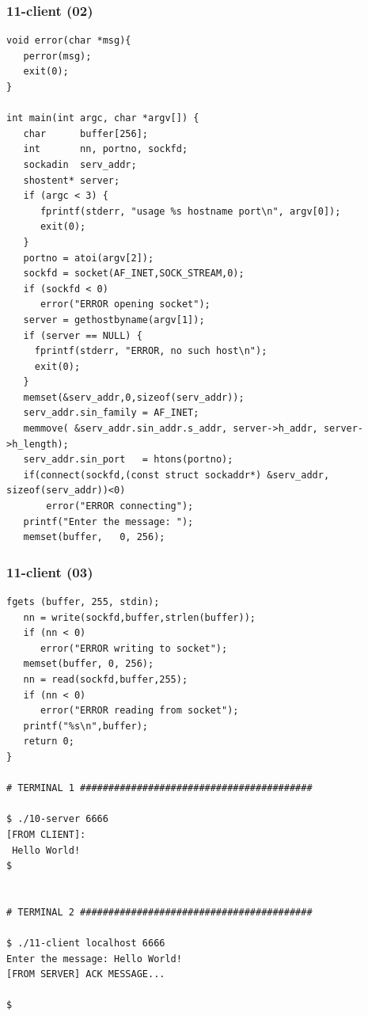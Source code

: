 \documentclass[aspectratio=169, xcolor=table, notheorems, hyperref={pdfpagelabels=false}]{beamer}
\begin{document}
\begin{frame}[fragile]
\frametitle{11-client (02)}
\begin{lstlisting}[basicstyle=\ttfamily\tiny]
void error(char *msg){
   perror(msg);
   exit(0);
}

int main(int argc, char *argv[]) {
   char      buffer[256];
   int       nn, portno, sockfd;
   sockadin  serv_addr;
   shostent* server;
   if (argc < 3) {
      fprintf(stderr, "usage %s hostname port\n", argv[0]);
      exit(0);
   }
   portno = atoi(argv[2]);
   sockfd = socket(AF_INET,SOCK_STREAM,0);
   if (sockfd < 0)
      error("ERROR opening socket");
   server = gethostbyname(argv[1]);
   if (server == NULL) {
     fprintf(stderr, "ERROR, no such host\n");
     exit(0);
   }
   memset(&serv_addr,0,sizeof(serv_addr));
   serv_addr.sin_family = AF_INET;
   memmove( &serv_addr.sin_addr.s_addr, server->h_addr, server->h_length);
   serv_addr.sin_port   = htons(portno);
   if(connect(sockfd,(const struct sockaddr*) &serv_addr, sizeof(serv_addr))<0)
       error("ERROR connecting");
   printf("Enter the message: ");
   memset(buffer,   0, 256);

\end{lstlisting}
\end{frame}

\begin{frame}[fragile]
\frametitle{11-client (03)}
\begin{lstlisting}[basicstyle=\ttfamily\tiny]
   fgets (buffer, 255, stdin);
   nn = write(sockfd,buffer,strlen(buffer));
   if (nn < 0)
      error("ERROR writing to socket");
   memset(buffer, 0, 256);
   nn = read(sockfd,buffer,255);
   if (nn < 0)
      error("ERROR reading from socket");
   printf("%s\n",buffer);
   return 0;
}

# TERMINAL 1 #########################################

$ ./10-server 6666
[FROM CLIENT]:
 Hello World!
$


# TERMINAL 2 #########################################

$ ./11-client localhost 6666
Enter the message: Hello World!
[FROM SERVER] ACK MESSAGE...

$

\end{lstlisting}
\end{frame}
\end{document}
